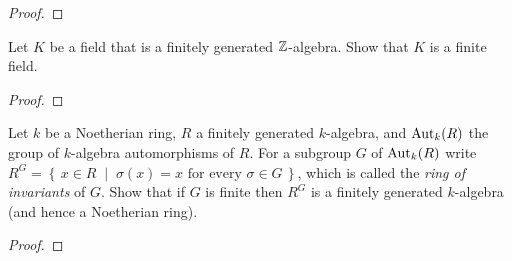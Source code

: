 \begin{proof}
\end{proof}
\newpage
\begin{problem}
Let $K$ be a field that is a finitely generated
$\mathbb{Z}$-algebra. Show that $K$ is a finite field.
\end{problem}
\begin{proof}
\end{proof}
\newpage
\begin{problem}
Let $k$ be a Noetherian ring, $R$ a finitely generated
$k$-algebra, and $\operatorname{Aut}_k(R)$ the group of $k$-algebra
automorphisms of $R$. For a subgroup $G$ of $\operatorname{Aut}_k(R)$ write
$R^G=\left\{\,x\in R\;\middle|\;\text{$\sigma(x)=x$ for every
    $\sigma\in G$}\,\right\}$, which is called the \emph{ring of
  invariants} of $G$. Show that if $G$ is finite then $R^G$ is a
finitely generated $k$-algebra (and hence a Noetherian ring).
\end{problem}
\begin{proof}
\end{proof}

